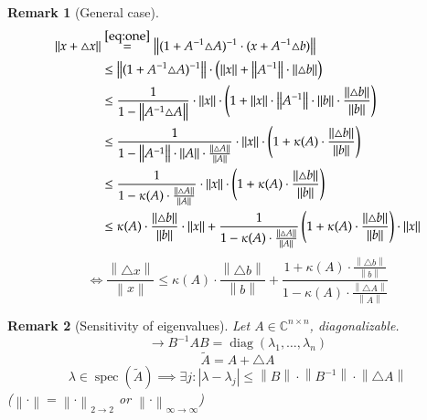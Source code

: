 \documentclass{article}
\newtheorem{remark}{Remark}  \numberwithin{remark}{section}
\newcommand{\norm}[1]{\left\|#1\right\|}
\newcommand{\card}[1]{\left|#1\right|}
\begin{document}
\begin{remark}[General case]
  \begin{align}
    \norm{x + \triangle x} &\overset{\eqref{eq:one}}{=} \norm{(1 + A^{-1} \triangle A)^{-1} \cdot (x + A^{-1} \triangle b)} \label{eq:three} \\
      &\leq \norm{(1 + A^{-1} \triangle A)^{-1}} \cdot \left(\norm{x} + \norm{A^{-1}} \cdot \norm{\triangle b}\right) \nonumber \\
      &\leq \frac{1}{1 - \norm{A^{-1} \triangle A}} \cdot \norm{x} \cdot \left(1 + \norm{x} \cdot \norm{A^{-1}} \cdot \norm{b} \cdot \frac{\norm{\triangle b}}{\norm{b}}\right) \nonumber \\
      &\leq \frac{1}{1 - \norm{A^{-1}} \cdot \norm{A} \cdot \frac{\norm{\triangle A}}{\norm{A}}} \cdot \norm{x} \cdot \left(1 + \kappa(A) \cdot \frac{\norm{\triangle b}}{\norm{b}}\right) \nonumber \\
      &\leq \frac{1}{1 - \kappa(A) \cdot \frac{\norm{\triangle A}}{\norm{A}}} \cdot \norm{x} \cdot \left(1 + \kappa(A) \cdot \frac{\norm{\triangle b}}{\norm{b}}\right) \nonumber \\
      &\leq \kappa(A) \cdot \frac{\norm{\triangle b}}{\norm{b}} \cdot \norm{x} + \frac{1}{1 - \kappa(A) \cdot \frac{\norm{\triangle A}}{\norm{A}}} \left(1 + \kappa(A) \cdot \frac{\norm{\triangle b}}{\norm{b}}\right) \cdot \norm{x}
  \end{align}
  \[ \iff \frac{\norm{\triangle x}}{\norm{x}} \leq \kappa(A) \cdot \frac{\norm{\triangle b}}{\norm{b}} + \frac{1 + \kappa(A) \cdot \frac{\norm{\triangle b}}{\norm{b}}}{1 - \kappa(A) \cdot \frac{\norm{\triangle A}}{\norm{A}}} \]
\end{remark}

\begin{remark}[Sensitivity of eigenvalues] %
  Let $A \in \mathbb C^{n \times n}$, diagonalizable.
  \[ \to B^{-1} AB = \operatorname{diag}(\lambda_1, \dots, \lambda_n) \]
  \[ \tilde A = A + \triangle A \]
  \[ \lambda \in \operatorname{spec}(\tilde A) \implies \exists j: \card{\lambda - \lambda_j} \leq \norm{B} \cdot \norm{B^{-1}} \cdot \norm{\triangle A} \]
  ($\norm{\cdot} = \norm{\cdot}_{2 \to 2}$ or $\norm{\cdot}_{\infty\to\infty}$)
\end{remark}
\end{document}
